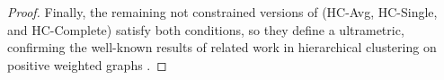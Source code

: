 \begin{proof}
Finally, the remaining not constrained versions of \algname{} (HC-Avg, HC-Single, and HC-Complete) satisfy both conditions, so they define a ultrametric, confirming the well-known results of related work in hierarchical clustering on positive weighted graphs \cite{johnson1967hierarchical,milligan1979ultrametric}.







\end{proof}

